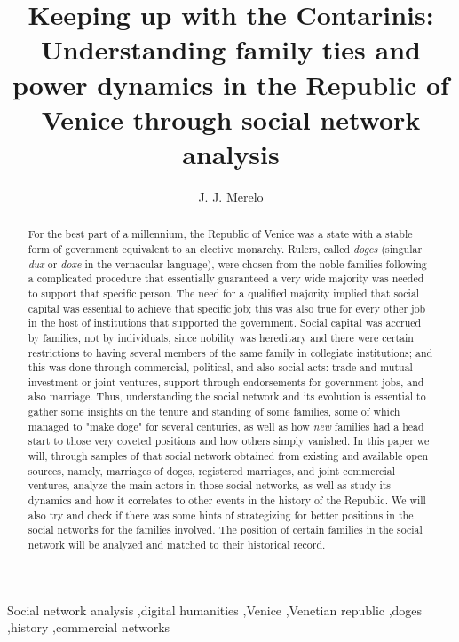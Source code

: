 \documentclass[preprint,12pt,authoryear]{elsarticle}\usepackage[]{graphicx}\usepackage[]{xcolor}
\begin{document}
\title{Keeping up with the Contarinis: Understanding family ties and power dynamics in the Republic of Venice through social network analysis}

\author[add1]{J. J. Merelo}
\address[add1]{Computer Engineering, Automatics and Robotics department,
  University of Granada (Spain)}


\newcommand{\coll}{\emph{colleganza}}
\newcommand{\colln}{\coll{} network}
\newcommand{\serr}{\emph{Serrata}}

\begin{frontmatter}

\begin{abstract}

For the best part of a millennium, the Republic of Venice was a state with a
stable form of government equivalent to an elective monarchy. Rulers, called
\emph{doges} (singular \emph{dux} or \emph{doxe} in the vernacular language),
were chosen from the noble families following a complicated procedure that
essentially guaranteed a very wide majority was needed to support that specific
person. The need for a qualified majority implied that social capital was
essential to achieve that specific job; this was also true for every other job
in the host of institutions that supported the government. Social capital was
accrued by families, not by individuals, since nobility was hereditary and there
were certain restrictions to having several members of the same family in
collegiate institutions; and this was done through commercial, political, and
also social acts: trade and mutual investment or joint ventures, support through
endorsements for government jobs, and also marriage. Thus, understanding the
social network and its evolution is essential to gather some insights on the
tenure and standing of some families, some of which managed to "make doge" for
several centuries, as well as how \emph{new} families had a head start to those
very coveted positions and how others simply vanished. In this paper we will,
through samples of that social network obtained from existing and available open
sources, namely, marriages of doges, registered marriages, and joint commercial
ventures, analyze the main actors in those social networks, as well as study its
dynamics and how it correlates to other events in the history of the
Republic. We will also try and check if there was some hints of strategizing for
better positions in the social networks for the families involved. The position
of certain families in the social network will be analyzed and matched to their
historical record.

\end{abstract}

\begin{keyword}
Social network analysis \sep digital humanities \sep Venice \sep Venetian republic \sep doges \sep history \sep commercial networks
\end{keyword}

\end{frontmatter}
\end{document}
